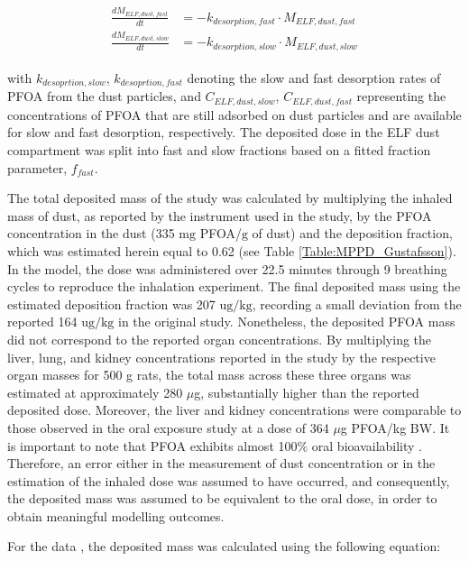\documentclass[preprint,12pt,authoryear]{elsarticle}
\begin{document}
\begin{align}
\begin{aligned}
\frac{dM_{ELF,dust,fast}}{dt} &= - k_{desorption,fast} \cdot M_{ELF,dust,fast}\\
\frac{dM_{ELF,dust,slow}}{dt} &= - k_{desorption,slow} \cdot M_{ELF,dust,slow}
\end{aligned}
\label{eq:PFOA_dust_deposition}
\end{align}

\noindent
with $k_{desoprtion,slow}$, $k_{desoprtion,fast}$ denoting the slow and fast desorption rates of PFOA from the dust particles, and $C_{ELF,dust, slow}$, $C_{ELF,dust, fast}$  representing the concentrations of PFOA  that are still adsorbed on dust particles and are available for slow and fast desorption, respectively. The deposited dose in the ELF dust compartment was split into fast and slow fractions based on a fitted fraction parameter, $f_{fast}$.  


The total deposited mass of the \citet{gustafsson_2022} study was calculated by multiplying the inhaled mass of dust, as reported by the instrument used in the study, by the PFOA concentration in the dust (335 $\text{mg}$ PFOA/$\text{g}$ of dust) and the deposition fraction, which was estimated herein equal to 0.62 (see Table \ref{Table:MPPD_Gustafsson}). In the model, the dose was administered over 22.5 minutes through 9 breathing cycles to reproduce the inhalation experiment. The final deposited mass using the estimated deposition fraction was 207 $\text{ug}/\text{kg}$,  recording a small deviation from the reported 164 $ \text{ug}/\text{kg}$ in the original study. Nonetheless, the deposited PFOA mass did not correspond to the reported organ concentrations. By multiplying the liver, lung, and kidney concentrations reported in the study by the respective organ masses for 500 g rats, the total mass across these three organs was estimated at approximately 280 $\mu$g, substantially higher than the reported deposited dose. Moreover, the liver and kidney concentrations were comparable to those observed in the oral exposure study at a dose of 364 $\mu$g PFOA/kg BW. It is important to note that PFOA exhibits almost 100\% oral bioavailability \citep{kemper_2003}. Therefore, an error either in the measurement of dust concentration or in the estimation of the inhaled dose was assumed to have occurred, and consequently, the deposited mass was assumed to be equivalent to the oral dose, in order to obtain meaningful modelling outcomes.

 For the \citep{hinderliter_2006} data , the deposited mass was calculated using the following equation:
\end{document}
